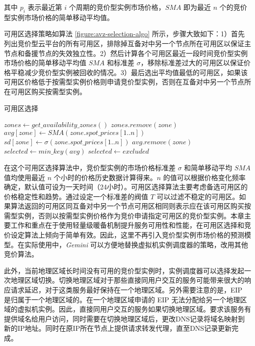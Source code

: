 其中 $p_i$ 表示最近第 $i$ 个周期的竞价型实例市场价格，$SMA$ 即为最近 $n$ 个的竞价型实例市场价格的简单移动平均值。

可用区选择策略如算法 \ref{figure:avz-selection-algo} 所示，步骤大致如下：1）首先列出竞价型云平台的所有可用区，排除掉互备对中另一个节点所在可用区以保证主节点和备援节点的失效独立性。2）然后计算各个可用区最近一段时间竞价型实例市场价格的简单移动平均值 $SMA$ 和标准差 $\sigma$，移除标准差过大的可用区以保证价格平稳减少竞价型实例被回收的情况。3）最后选出平均值最低的可用区，如果该可用区价格低于按需型实例价格则申请竞价型实例，否则在互备对中另一个节点所在可用区购买按需型实例。
\begin{algorithm}
\caption{可用区选择}
\label{figure:avz-selection-algo}
$zones\gets get\_availability\_zones()$
{
  {
    $zones.remove(zone)$\;
  }
}
{
  $avg[zone]\gets SMA(zone.spot\_prices[1..n])$
  $sd[zone]\gets \sigma(zone.spot\_prices[1..n])$
}
{
  {
    $avg.remove(zone)$\;
  }
}
$selected\gets min\_key(avg)$\;
{
  $selected\gets excluded$\;
}
\end{algorithm}

在这个可用区选择算法中，竞价型实例的市场价格标准差 $\sigma$ 和简单移动平均 $SMA$ 值均使用最近 $n$ 个小时的价格历史数据计算得来。$n$ 的值可以根据价格变化频率确定，默认值可设为一天时间（24小时）。可用区选择算法主要考虑备选可用区的价格稳定性和趋势。通过设定一个标准差的阀值 $T$ 可以过滤不稳定的可用区。如果算法返回的可用区同互备对中另一个节点可用区相同则表示应在该可用区购买按需型实例，否则以按需型实例价格作为竞价申请指定可用区的竞价型实例。本章主要工作和重点在于使用轻量级暖备机制提升服务可用性和性能，在可用区选择和竞价设定算法上倾向于简单有效。因此，这里不再引入竞价型实例市场价格的预测模型。在实际使用中，\emph{Gemini} 可以方便地替换虚拟机实例调度器的策略，改用其他竞价算法。

此外，当前地理区域长时间没有可用的竞价型实例时，实例调度器可以选择发起一次地理区域切换。切换地理区域对于那些直接同用户交互的服务可能带来很大的响应请求延迟，对于这类服务最好保持在一个地理区域。另外需要注意的是，EIP 是归属于一个地理区域的。在一个地理区域申请的 EIP 无法分配给另一个地理区域的虚拟机实例。因此，直接同用户交互的服务如果切换地理区域。要求该服务有提供域名给用户访问，同时需要在切换地理区域后，更改DNS记录将域名映射到新的IP地址。同时在原IP所在节点上提供请求转发代理，直至DNS记录更新完成。

